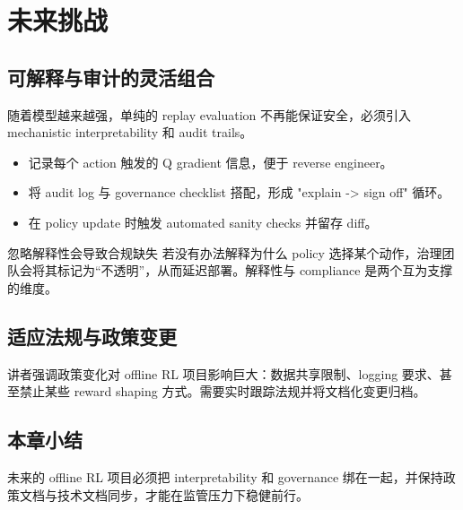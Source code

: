 \section{未来挑战}

\subsection{可解释与审计的灵活组合}

随着模型越来越强，单纯的 replay evaluation 不再能保证安全，必须引入 mechanistic interpretability 和 audit trails。

\begin{itemize}
    \item 记录每个 action 触发的 Q gradient 信息，便于 reverse engineer。
    \item 将 audit log 与 governance checklist 搭配，形成 "explain -> sign off" 循环。
    \item 在 policy update 时触发 automated sanity checks 并留存 diff。
\end{itemize}

\begin{warningbox}{忽略解释性会导致合规缺失}
若没有办法解释为什么 policy 选择某个动作，治理团队会将其标记为“不透明”，从而延迟部署。解释性与 compliance 是两个互为支撑的维度。
\end{warningbox}

\subsection{适应法规与政策变更}

讲者强调政策变化对 offline RL 项目影响巨大：数据共享限制、logging 要求、甚至禁止某些 reward shaping 方式。需要实时跟踪法规并将文档化变更归档。

\subsection{本章小结}

未来的 offline RL 项目必须把 interpretability 和 governance 绑在一起，并保持政策文档与技术文档同步，才能在监管压力下稳健前行。


